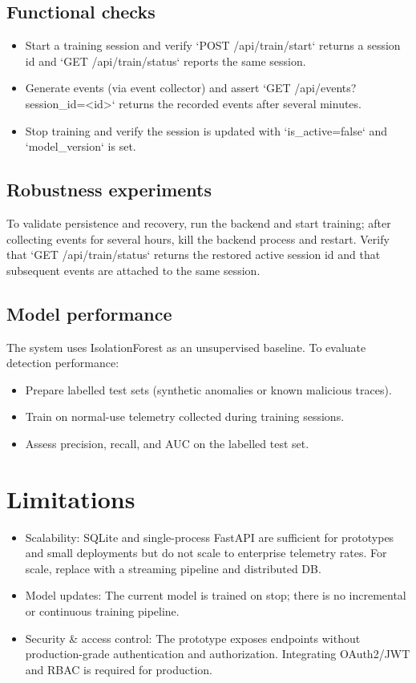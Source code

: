 \documentclass[conference]{IEEEtran}
\begin{document}
\subsection{Functional checks}
\begin{itemize}[leftmargin=*]
  \item Start a training session and verify `POST /api/train/start` returns a session id and `GET /api/train/status` reports the same session.
  \item Generate events (via event collector) and assert `GET /api/events?session_id=<id>` returns the recorded events after several minutes.
  \item Stop training and verify the session is updated with `is_active=false` and `model_version` is set.
\end{itemize}

\subsection{Robustness experiments}
To validate persistence and recovery, run the backend and start training; after collecting events for several hours, kill the backend process and restart. Verify that `GET /api/train/status` returns the restored active session id and that subsequent events are attached to the same session.

\subsection{Model performance}
The system uses IsolationForest as an unsupervised baseline. To evaluate detection performance:
\begin{itemize}[leftmargin=*]
  \item Prepare labelled test sets (synthetic anomalies or known malicious traces).
  \item Train on normal-use telemetry collected during training sessions.
  \item Assess precision, recall, and AUC on the labelled test set.
\end{itemize}

\section{Limitations}
\begin{itemize}[leftmargin=*]
  \item Scalability: SQLite and single-process FastAPI are sufficient for prototypes and small deployments but do not scale to enterprise telemetry rates. For scale, replace with a streaming pipeline and distributed DB.
  \item Model updates: The current model is trained on stop; there is no incremental or continuous training pipeline.
  \item Security & access control: The prototype exposes endpoints without production-grade authentication and authorization. Integrating OAuth2/JWT and RBAC is required for production.
\end{itemize}
\end{document}
